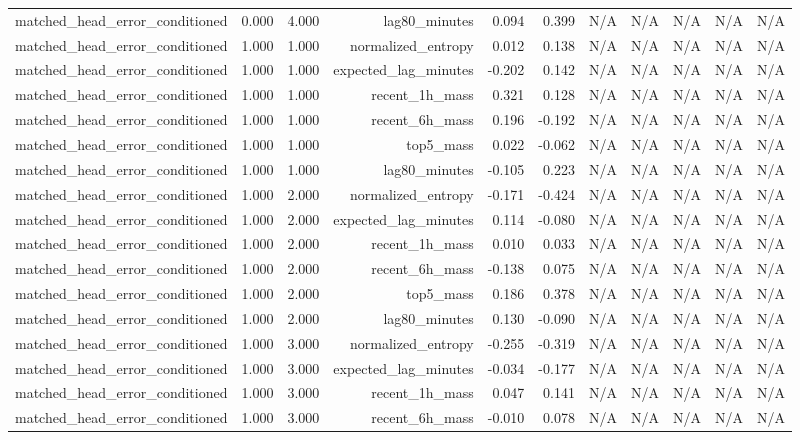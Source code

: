 \begin{table}[h!]
\begin{tabular}{lrrrrrrrrrr}
matched\_head\_error\_conditioned & 0.000 & 4.000 & lag80\_minutes & 0.094 & 0.399 & N/A & N/A & N/A & N/A & N/A \\
matched\_head\_error\_conditioned & 1.000 & 1.000 & normalized\_entropy & 0.012 & 0.138 & N/A & N/A & N/A & N/A & N/A \\
matched\_head\_error\_conditioned & 1.000 & 1.000 & expected\_lag\_minutes & -0.202 & 0.142 & N/A & N/A & N/A & N/A & N/A \\
matched\_head\_error\_conditioned & 1.000 & 1.000 & recent\_1h\_mass & 0.321 & 0.128 & N/A & N/A & N/A & N/A & N/A \\
matched\_head\_error\_conditioned & 1.000 & 1.000 & recent\_6h\_mass & 0.196 & -0.192 & N/A & N/A & N/A & N/A & N/A \\
matched\_head\_error\_conditioned & 1.000 & 1.000 & top5\_mass & 0.022 & -0.062 & N/A & N/A & N/A & N/A & N/A \\
matched\_head\_error\_conditioned & 1.000 & 1.000 & lag80\_minutes & -0.105 & 0.223 & N/A & N/A & N/A & N/A & N/A \\
matched\_head\_error\_conditioned & 1.000 & 2.000 & normalized\_entropy & -0.171 & -0.424 & N/A & N/A & N/A & N/A & N/A \\
matched\_head\_error\_conditioned & 1.000 & 2.000 & expected\_lag\_minutes & 0.114 & -0.080 & N/A & N/A & N/A & N/A & N/A \\
matched\_head\_error\_conditioned & 1.000 & 2.000 & recent\_1h\_mass & 0.010 & 0.033 & N/A & N/A & N/A & N/A & N/A \\
matched\_head\_error\_conditioned & 1.000 & 2.000 & recent\_6h\_mass & -0.138 & 0.075 & N/A & N/A & N/A & N/A & N/A \\
matched\_head\_error\_conditioned & 1.000 & 2.000 & top5\_mass & 0.186 & 0.378 & N/A & N/A & N/A & N/A & N/A \\
matched\_head\_error\_conditioned & 1.000 & 2.000 & lag80\_minutes & 0.130 & -0.090 & N/A & N/A & N/A & N/A & N/A \\
matched\_head\_error\_conditioned & 1.000 & 3.000 & normalized\_entropy & -0.255 & -0.319 & N/A & N/A & N/A & N/A & N/A \\
matched\_head\_error\_conditioned & 1.000 & 3.000 & expected\_lag\_minutes & -0.034 & -0.177 & N/A & N/A & N/A & N/A & N/A \\
matched\_head\_error\_conditioned & 1.000 & 3.000 & recent\_1h\_mass & 0.047 & 0.141 & N/A & N/A & N/A & N/A & N/A \\
matched\_head\_error\_conditioned & 1.000 & 3.000 & recent\_6h\_mass & -0.010 & 0.078 & N/A & N/A & N/A & N/A & N/A \\

\end{tabular}
\end{table}
